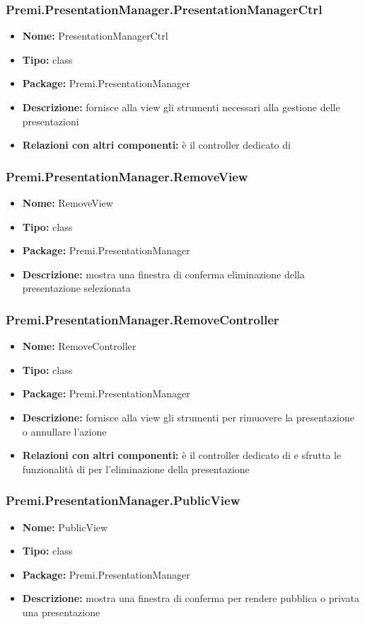 \subsubsection{Premi.PresentationManager.PresentationManagerCtrl}
\begin{itemize}
  \item \textbf{Nome:} PresentationManagerCtrl
  \item \textbf{Tipo:} class
  \item \textbf{Package:} Premi.PresentationManager
  \item \textbf{Descrizione:} fornisce alla view gli strumenti necessari alla gestione delle presentazioni
  \item \textbf{Relazioni con altri componenti:} è il controller dedicato di   
\end{itemize}
\subsubsection{Premi.PresentationManager.RemoveView}
\begin{itemize}
  \item \textbf{Nome:} RemoveView
  \item \textbf{Tipo:} class
  \item \textbf{Package:} Premi.PresentationManager
  \item \textbf{Descrizione:} mostra una finestra di conferma eliminazione della presentazione selezionata
\end{itemize}
\subsubsection{Premi.PresentationManager.RemoveController}
\begin{itemize}
  \item \textbf{Nome:} RemoveController
  \item \textbf{Tipo:} class
  \item \textbf{Package:} Premi.PresentationManager
  \item \textbf{Descrizione:} fornisce alla view gli strumenti per rimuovere la presentazione o annullare l'azione
  \item \textbf{Relazioni con altri componenti:} è il controller dedicato di   e sfrutta le funzionalità di  per l'eliminazione della presentazione 
\end{itemize}
\subsubsection{Premi.PresentationManager.PublicView}
\begin{itemize}
  \item \textbf{Nome:} PublicView
  \item \textbf{Tipo:} class
  \item \textbf{Package:} Premi.PresentationManager
  \item \textbf{Descrizione:} mostra una finestra di conferma per rendere pubblica o privata una presentazione
\end{itemize}
